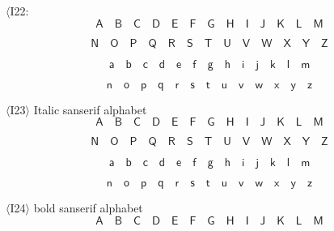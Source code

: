 \documentclass{book}
\begin{document}
$\langle$I22:
\[\mathsf{A}\quad \mathsf{B}\quad \mathsf{C}\quad \mathsf{D}\quad
\mathsf{E}\quad \mathsf{F}\quad \mathsf{G}\quad \mathsf{H}\quad 
\mathsf{I}\quad \mathsf{J}\quad \mathsf{K}\quad \mathsf{L}\quad 
\mathsf{M}\]

\[\mathsf{N}\quad \mathsf{O}\quad \mathsf{P}\quad 
\mathsf{Q}\quad \mathsf{R}\quad \mathsf{S}\quad \mathsf{T}\quad 
\mathsf{U}\quad \mathsf{V}\quad \mathsf{W}\quad \mathsf{X}\quad 
\mathsf{Y}\quad \mathsf{Z}\] 

\[\mathsf{a}\quad \mathsf{b}\quad
\mathsf{c}\quad \mathsf{d}\quad \mathsf{e}\quad \mathsf{f}\quad 
\mathsf{g}\quad \mathsf{h}\quad \mathsf{i}\quad \mathsf{j}\quad 
\mathsf{k}\quad \mathsf{l}\quad \mathsf{m}\] 

\[\mathsf{n}\quad 
\mathsf{o}\quad \mathsf{p}\quad \mathsf{q}\quad \mathsf{r}\quad 
\mathsf{s}\quad \mathsf{t}\quad \mathsf{u}\quad \mathsf{v}\quad 
\mathsf{w}\quad \mathsf{x}\quad \mathsf{y}\quad \mathsf{z}\]

$\langle$I23$\rangle$ Italic sanserif alphabet
\[\mathit{\mathsf{A}}\quad \mathit{\mathsf{B}}\quad \mathit{\mathsf{C}}\quad \mathit{\mathsf{D}}\quad
\mathit{\mathsf{E}}\quad \mathit{\mathsf{F}}\quad \mathit{\mathsf{G}}\quad \mathit{\mathsf{H}}\quad 
\mathit{\mathsf{I}}\quad \mathit{\mathsf{J}}\quad \mathit{\mathsf{K}}\quad \mathit{\mathsf{L}}\quad 
\mathit{\mathsf{M}}\] 

\[\mathit{\mathsf{N}}\quad \mathit{\mathsf{O}}\quad \mathit{\mathsf{P}}\quad 
\mathit{\mathsf{Q}}\quad \mathit{\mathsf{R}}\quad \mathit{\mathsf{S}}\quad \mathit{\mathsf{T}}\quad 
\mathit{\mathsf{U}}\quad \mathit{\mathsf{V}}\quad \mathit{\mathsf{W}}\quad \mathit{\mathsf{X}}\quad 
\mathit{\mathsf{Y}}\quad \mathit{\mathsf{Z}}\] 

\[\mathit{\mathsf{a}}\quad \mathit{\mathsf{b}}\quad
\mathit{\mathsf{c}}\quad \mathit{\mathsf{d}}\quad \mathit{\mathsf{e}}\quad \mathit{\mathsf{f}}\quad 
\mathit{\mathsf{g}}\quad \mathit{\mathsf{h}}\quad \mathit{\mathsf{i}}\quad \mathit{\mathsf{j}}\quad 
\mathit{\mathsf{k}}\quad \mathit{\mathsf{l}}\quad \mathit{\mathsf{m}}\]

\[\mathit{\mathsf{n}}\quad 
\mathit{\mathsf{o}}\quad \mathit{\mathsf{p}}\quad \mathit{\mathsf{q}}\quad \mathit{\mathsf{r}}\quad 
\mathit{\mathsf{s}}\quad \mathit{\mathsf{t}}\quad \mathit{\mathsf{u}}\quad \mathit{\mathsf{v}}\quad 
\mathit{\mathsf{w}}\quad \mathit{\mathsf{x}}\quad \mathit{\mathsf{y}}\quad \mathit{\mathsf{z}}\]

$\langle$I24$\rangle$ bold sanserif alphabet
\[\mathbf{\mathsf{A}}\quad \mathbf{\mathsf{B}}\quad \mathbf{\mathsf{C}}\quad \mathbf{\mathsf{D}}\quad
\mathbf{\mathsf{E}}\quad \mathbf{\mathsf{F}}\quad \mathbf{\mathsf{G}}\quad \mathbf{\mathsf{H}}\quad 
\mathbf{\mathsf{I}}\quad \mathbf{\mathsf{J}}\quad \mathbf{\mathsf{K}}\quad \mathbf{\mathsf{L}}\quad 
\mathbf{\mathsf{M}}\] 
\end{document}

